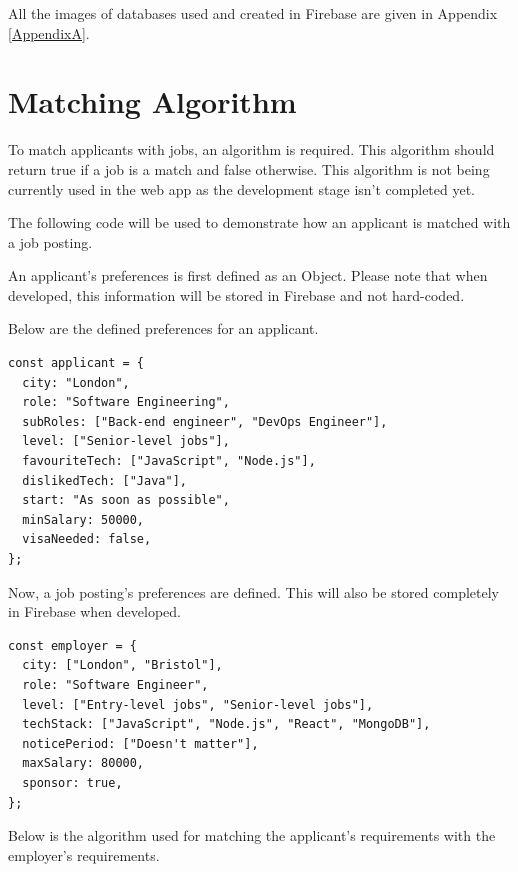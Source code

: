 All the images of databases used and created in Firebase are given in Appendix \ref{AppendixA}.

\section{Matching Algorithm}
To match applicants with jobs, an algorithm is required. This algorithm should return true if a job is a match and false otherwise. This algorithm is not being currently used in the web app as the development stage isn't completed yet. 

The following code will be used to demonstrate how an applicant is matched with a job posting.

An applicant's preferences is first defined as an Object. Please note that when developed, this information will be stored in Firebase and not hard-coded.

Below are the defined preferences for an applicant.
\begin{lstlisting}
const applicant = {
  city: "London",
  role: "Software Engineering",
  subRoles: ["Back-end engineer", "DevOps Engineer"],
  level: ["Senior-level jobs"],
  favouriteTech: ["JavaScript", "Node.js"],
  dislikedTech: ["Java"],
  start: "As soon as possible",
  minSalary: 50000,
  visaNeeded: false,
};
\end{lstlisting}

Now, a job posting's preferences are defined. This will also be stored completely in Firebase when developed.

\begin{lstlisting}
const employer = {
  city: ["London", "Bristol"],
  role: "Software Engineer",
  level: ["Entry-level jobs", "Senior-level jobs"],
  techStack: ["JavaScript", "Node.js", "React", "MongoDB"],
  noticePeriod: ["Doesn't matter"],
  maxSalary: 80000,
  sponsor: true,
};
\end{lstlisting}

Below is the algorithm used for matching the applicant's requirements with the employer's requirements. 

